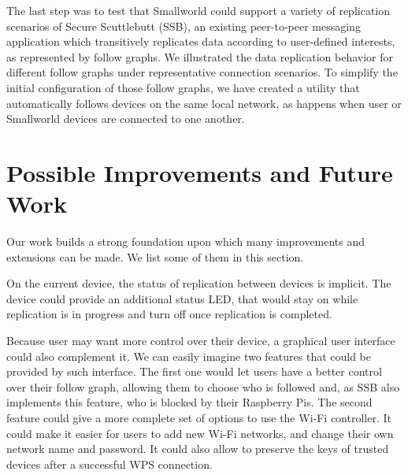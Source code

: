 \documentclass[a4paper,11pt,oneside]{report}
\begin{document}
The last step was to test that Smallworld could support a variety of replication scenarios of Secure Scuttlebutt (SSB), an existing peer-to-peer messaging application which transitively replicates data according to user-defined interests, as represented by follow graphs. We illustrated the data replication behavior for different follow graphs under representative connection scenarios. To simplify the initial configuration of those follow graphs, we have created a utility that automatically follows devices on the same local network, as happens when user or Smallworld devices are connected to one another.

\section{Possible Improvements and Future Work}

Our work builds a strong foundation upon which many improvements and extensions can be made. We list some of them in this section.

On the current device, the status of replication between devices is implicit. The device could provide an additional status LED, that would stay on while replication is in progress and turn off once replication is completed.

Because user may want more control over their device, a graphical user interface could also complement it. We can easily imagine two features that could be provided by such interface. The first one would let users have a better control over their follow graph, allowing them to choose who is followed and, as SSB also implements this feature, who is blocked by their Raspberry Pis. The second feature could give a more complete set of options to use the Wi-Fi controller. It could make it easier for users to add new Wi-Fi networks, and change their own network name and password. It could also allow to preserve the keys of trusted devices after a successful WPS connection.


\cleardoublepage
{}
{}
\printbibliography
\end{document}
